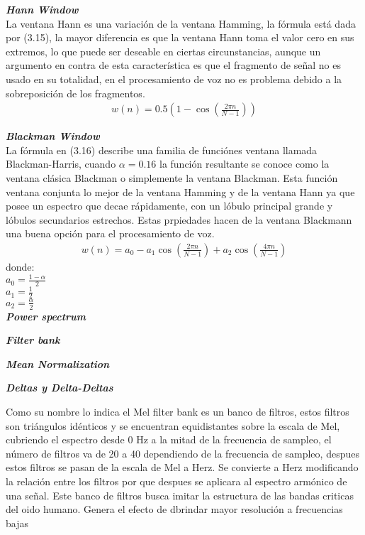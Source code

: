 \noindent
\textbf{\textit{Hann Window}}\\
\indent
La ventana Hann es una variaci\'on de la ventana Hamming, la f\'ormula est\'a dada por (3.15), la mayor diferencia es que la ventana Hann toma el valor cero en sus extremos, lo que puede ser deseable en ciertas circunstancias, aunque un argumento en contra de esta caracter\'istica es que el fragmento de señal no es usado en su totalidad, en el procesamiento de voz no es problema debido a la sobreposici\'on de los fragmentos. 
\begin{align}
   w(n) = 0.5(1 - \cos(\frac{2\pi n }{N - 1})) 
\end{align}

\noindent
\textbf{\textit{Blackman Window}}\\
\indent
La f\'ormula en (3.16) describe una familia de funci\'ones ventana llamada Blackman-Harris, cuando $\alpha = 0.16$ la funci\'on resultante se conoce como la ventana cl\'asica Blackman o simplemente la ventana Blackman. Esta funci\'on ventana conjunta lo mejor de la ventana Hamming y de la ventana Hann ya que posee un espectro que decae r\'apidamente, con un l\'obulo principal grande y l\'obulos secundarios estrechos. Estas prpiedades hacen de la ventana Blackmann una buena opci\'on para el procesamiento de voz.\\
\begin{align}
   w(n) = a_0 - a_1\cos(\frac{2\pi n}{N - 1}) + a_2\cos(\frac{4\pi n}{N - 1})
\end{align}
donde:\\
\indent
$a_0 = \frac{1 - \alpha}{2}$\\
\indent
$a_1 = \frac{1}{2}$\\
\indent
$a_2 = \frac{\alpha}{2}$\\

\noindent
\textbf{\textit{Power spectrum}}\\
\indent

\noindent
\textbf{\textit{Filter bank}}\\
\indent

\noindent
\textbf{\textit{Mean Normalization}}\\
\indent

\noindent
\textbf{\textit{Deltas y Delta-Deltas}}\\
\indent

Como su nombre lo indica el Mel filter bank es un banco de filtros, estos filtros son triángulos idénticos y se encuentran equidistantes sobre la escala de Mel, cubriendo el espectro desde 0 Hz a la mitad de la frecuencia de sampleo, el número de filtros va de 20 a 40 dependiendo de la frecuencia de sampleo, despues estos filtros se pasan de la escala de Mel a Herz. Se convierte a Herz modificando la relación entre los filtros por que despues se aplicara al espectro armónico de una señal. Este banco de filtros busca imitar la estructura de las bandas criticas del oido humano. Genera el efecto de dbrindar mayor resolución a frecuencias bajas\\

